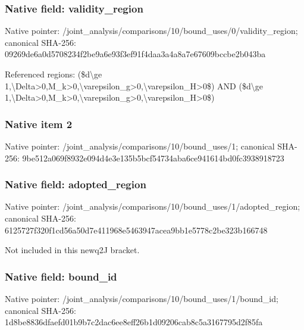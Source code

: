 \documentclass[10pt,a4paper]{article}
\begin{document}
\subsubsection{Native field: validity\_\allowbreak{}region}
Native pointer: /joint\_\allowbreak{}analysis/comparisons/10/bound\_\allowbreak{}uses/0/validity\_\allowbreak{}region; canonical SHA-256: 09269de6a0d5708234f2be9a6e93f3ef91f4daa3a4a8a7e67609bccbe2b043ba

\begingroup\raggedright\sloppy Referenced regions:\allowbreak{} (\$d\textbackslash{}ge 1,\allowbreak{}\textbackslash{}Delta>0,\allowbreak{}M\_\allowbreak{}k>0,\allowbreak{}\textbackslash{}varepsilon\_\allowbreak{}g>0,\allowbreak{}\textbackslash{}varepsilon\_\allowbreak{}H>0\$) AND (\$d\textbackslash{}ge 1,\allowbreak{}\textbackslash{}Delta>0,\allowbreak{}M\_\allowbreak{}k>0,\allowbreak{}\textbackslash{}varepsilon\_\allowbreak{}g>0,\allowbreak{}\textbackslash{}varepsilon\_\allowbreak{}H>0\$)\par\endgroup

\subsubsection{Native item 2}
Native pointer: /joint\_\allowbreak{}analysis/comparisons/10/bound\_\allowbreak{}uses/1; canonical SHA-256: 9be512a069f8932e094d4e3e135b5bcf54734aba6ce941614bd0fc3938918723

\subsubsection{Native field: adopted\_\allowbreak{}region}
Native pointer: /joint\_\allowbreak{}analysis/comparisons/10/bound\_\allowbreak{}uses/1/adopted\_\allowbreak{}region; canonical SHA-256: 6125727f320f1cd56a50d7e411968e5463947acea9bb1e5778c2be323b166748

\begingroup\raggedright\sloppy Not included in this newq2J bracket.\par\endgroup

\subsubsection{Native field: bound\_\allowbreak{}id}
Native pointer: /joint\_\allowbreak{}analysis/comparisons/10/bound\_\allowbreak{}uses/1/bound\_\allowbreak{}id; canonical SHA-256: 1d8be8836dfaefd01b9b7c2dac6ee8eff26b1d09206cab8c5a3167795d2f85fa
\end{document}
